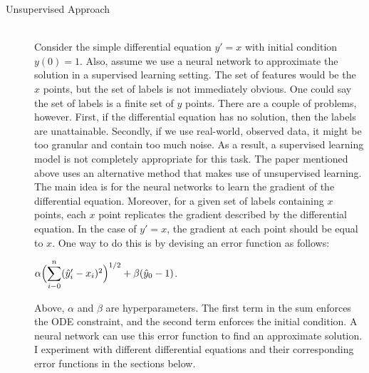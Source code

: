 \documentclass[12pt]{article}
\newcommand{\dsum}[2]{\mathlarger{\sum}_{#1}^{#2}}
\newcommand{\bgc}{\begin{center}}
\newcommand{\enc}{\end{center}}
\begin{document}
\begin{description}
    \item[Unsupervised Approach] \hfill \\
    Consider the simple differential equation $y' = x$ with initial condition
    $y(0) = 1$. Also, assume we use a neural network to approximate the
    solution in a supervised learning setting. The set of features would be the
    $x$ points, but the set of labels is not immediately obvious. One could say
    the set of labels is a finite set of $y$ points. There are a couple of
    problems, however. First, if the differential equation has no solution,
    then the labels are unattainable. Secondly, if we use real-world, observed
    data, it might be too granular and contain too much noise. As a result, a
    supervised learning model is not completely appropriate for this task. The
    paper mentioned above uses an alternative method that makes use of
    unsupervised learning. The main idea is for the neural networks to learn
    the gradient of the differential equation. Moreover, for a given set of
    labels containing $x$ points, each $x$ point replicates the gradient
    described by the differential equation. In the case of $y' = x$, the
    gradient at each point should be equal to $x$. One way to do this is by
    devising an error function as follows: 
    \bgc 
    $\alpha\Bigl(\dsum{i-0}{n}(\hat{y}_i' - x_i)^2\Bigr)^{1/2} + \beta(\hat{y}_0 - 1)$.
    \enc
    Above, $\alpha$ and $\beta$ are hyperparameters. The first term in the sum
    enforces the ODE constraint, and the second term enforces the initial
    condition. A neural network can use this error function to find an
    approximate solution. I experiment with different differential equations
    and their corresponding error functions in the sections below. 


\end{description}
\end{document}
